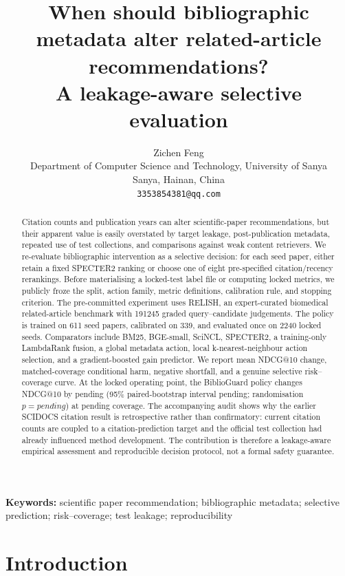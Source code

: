 \documentclass[11pt]{article}
\title{When should bibliographic metadata alter related-article recommendations?\\
A leakage-aware selective evaluation}
\author{Zichen Feng\\
Department of Computer Science and Technology, University of Sanya\\
Sanya, Hainan, China\\
\texttt{3353854381@qq.com}}
\date{}
\newcommand{\dataset}{RELISH}
\newcommand{\TrainQueries}{611}
\newcommand{\CalibrationQueries}{339}
\newcommand{\TestQueries}{2240}
\newcommand{\CandidatePairs}{191245}
\newcommand{\PrimaryGain}{pending}
\newcommand{\PrimaryCI}{pending}
\newcommand{\PrimaryPValue}{pending}
\newcommand{\PrimaryCoverage}{pending}
\begin{document}
\maketitle

\begin{abstract}
Citation counts and publication years can alter scientific-paper recommendations,
but their apparent value is easily overstated by target leakage, post-publication
metadata, repeated use of test collections, and comparisons against weak content
retrievers.  We re-evaluate bibliographic intervention as a selective decision: for
each seed paper, either retain a fixed SPECTER2 ranking or choose one of eight
pre-specified citation/recency rerankings.  Before materialising a locked-test label file
or computing locked metrics, we publicly froze the split, action family, metric
definitions, calibration rule, and stopping criterion.  The pre-committed experiment
uses \dataset, an expert-curated biomedical
related-article benchmark with \CandidatePairs{} graded query--candidate judgements.
The policy is trained on \TrainQueries{} seed papers, calibrated on \CalibrationQueries{},
and evaluated once on \TestQueries{} locked seeds.  Comparators include BM25,
BGE-small, SciNCL, SPECTER2, a training-only LambdaRank fusion, a global metadata
action, local k-nearest-neighbour action selection, and a gradient-boosted gain
predictor.  We report mean NDCG@10 change, matched-coverage conditional harm,
negative shortfall, and a genuine selective risk--coverage curve.  At the locked
operating point, the BiblioGuard policy changes NDCG@10 by \PrimaryGain{}
(95\% paired-bootstrap interval \PrimaryCI{}; randomisation \(p=\PrimaryPValue\))
at \PrimaryCoverage{} coverage.  The accompanying audit shows why the earlier
SCIDOCS citation result is retrospective rather than confirmatory: current citation
counts are coupled to a citation-prediction target and the official test collection
had already influenced method development.  The contribution is therefore a
leakage-aware empirical assessment and reproducible decision protocol, not a formal
safety guarantee.
\end{abstract}

\noindent\textbf{Keywords:} scientific paper recommendation; bibliographic metadata;
selective prediction; risk--coverage; test leakage; reproducibility

\section{Introduction}
\end{document}
